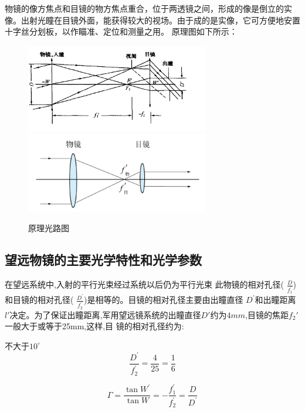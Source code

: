 \documentclass{article}
\begin{document}
物镜的像方焦点和目镜的物方焦点重合，位于两透镜之间，形成的像是倒立的实像。出射光瞳在目镜外面，能获得较大的视场。由于成的是实像，它可方便地安置十字丝分划板，以作瞄准、定位和测量之用。
原理图如下所示：
\begin{figure}[H]
    \centering
    \includegraphics[width=8cm]{img/1.png}
    \includegraphics[width=8cm]{img/2.png}
    \caption{原理光路图}
    \end{figure}
\subsection{望远物镜的主要光学特性和光学参数}
\begin{description}[leftmargin=1.7cm,style=nextline,nosep]%
  \item[相对孔径不大]  在望远系统中,入射的平行光束经过系统以后仍为平行光束
  此物镜的相对孔径( $\displaystyle   \frac{D}{f_{1}^{\prime}} $)和目镜的相对孔径( $\displaystyle   \frac{D^{\prime}}{f_{2}^{\prime}} $)是相等的。目镜的相对孔径主要由出瞳直径
  $ D^{\prime} $和出瞳距离$l'$决定。为了保证出瞳距离,军用望远镜系统的出瞳直径$D'$约为$4mm$,目镜的焦距$ f_{2}' $ 一般大于或等于25mm,这样,目
  镜的相对孔径约为:
  \item[视场角小] 不大于$10^{\circ}$
 \[\frac{D^{\prime}}{f_{2}^{\prime}}= \frac{4}{25}= \frac{1}{6} \]
 \item[望远镜视放大倍率] \[\Gamma= \frac{\tan W^{\prime}}{\tan W}=- \frac{f^{\prime}_{1}}{f^{\prime}_{2}}= \frac{D}{D^{\prime}} \tag{1.1}\] 
\end{description}
\end{document}
